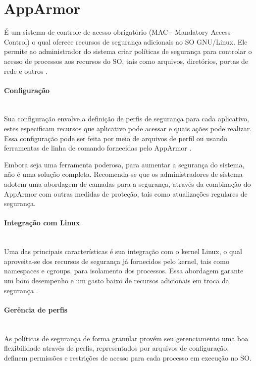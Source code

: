 \section{AppArmor}
É um sistema de controle de acesso obrigatório (MAC - Mandatory Access Control) o qual oferece recursos de segurança adicionais ao SO GNU/Linux. Ele permite ao administrador do sistema criar políticas de segurança para controlar o acesso de processos aos recursos do SO, tais como arquivos, diretórios, portas de rede e outros \cite{apparmor-gitlab}.
 
\paragraph*{Configuração}\mbox{}\\

Sua configuração envolve a definição de perfis de segurança para cada aplicativo, estes especificam recursos que aplicativo pode acessar e quais ações pode realizar. Essa configuração pode ser feita por meio de arquivos de perfil ou usando ferramentas de linha de comando fornecidas pelo AppArmor \cite{apparmor-Ubuntu-Linux-server, apparmor-gitlab}.

Embora seja uma ferramenta poderosa, para aumentar a segurança do sistema, não é uma solução completa. Recomenda-se que os administradores de sistema adotem uma abordagem de camadas para a segurança, através da combinação do AppArmor com outras medidas de proteção, tais como atualizações regulares de segurança.

\paragraph*{Integração com Linux}\mbox{}\\

Uma das principais características é sua integração com o kernel Linux, o qual aproveita-se dos recursos de segurança já fornecidos pelo kernel, tais como namespaces e cgroups, para isolamento dos processos. Essa abordagem garante um bom desempenho e um gasto baixo de recursos adicionais em troca da segurança \cite{hardening-linux}.

\paragraph*{Gerência de perfis}\mbox{}\\

As políticas de segurança de forma granular provém seu gerenciamento uma boa flexibilidade através de perfis, representados por arquivos de configuração, definem permissões e restrições de acesso para cada processo em execução no SO.

